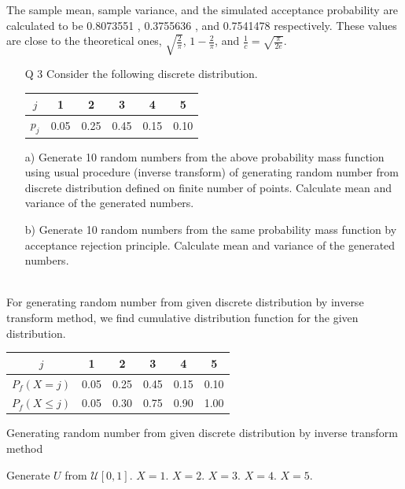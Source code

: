 \documentclass[11pt]{article}
\begin{document}
The sample mean, sample variance, and the simulated acceptance probability are calculated to be 0.8073551 , 0.3755636 , and 0.7541478 respectively.
These values are close to the theoretical ones, $\sqrt{\frac{2}{\pi}}$, $1 - \frac{2}{\pi}$, and $\frac{1}{c} = \sqrt{\frac{\pi}{2e}}$.

\newpage

\begin{enumerate}
\item[Q 3]  Consider the following discrete distribution.
\begin{center}
\begin{tabular}{ cccccc } 
  $j$ & 1 & 2 & 3 & 4 & 5 \\
  \hline
  $p_{j}$ & 0.05 & 0.25 & 0.45 & 0.15 & 0.10 \\
\end{tabular}
\end{center}

a) Generate 10 random numbers from the above probability mass function using usual procedure (inverse transform) of generating random number from discrete distribution defined on finite number of points.
Calculate mean and variance of the generated numbers.

b) Generate 10 random numbers from the same probability mass function by acceptance rejection principle.
Calculate mean and variance of the generated numbers.

\end{enumerate}

\\
 For generating random number from given discrete distribution by inverse transform method, we find cumulative distribution function for the given distribution.\\
\begin{center}
\begin{tabular}{ cccccc } 
  $j$ & 1 & 2 & 3 & 4 & 5 \\
  \hline
  $P_f(X = j)$ & 0.05 & 0.25 & 0.45 & 0.15 & 0.10 \\
  \hline
  $P_f(X \leq j)$ & 0.05 & 0.30 & 0.75 & 0.90 & 1.00 \\
\end{tabular}
\end{center}

\begin{algorithm}[H]
\caption{Generating random number from given discrete distribution by inverse transform method}
\begin{algorithmic}[1]
\STATE Generate $U$ from $\mathcal{U}[0,1]$.
{}
  \STATE  $X = 1$.
  \STATE  $X = 2$.
  \STATE  $X = 3$.
  \STATE  $X = 4$.
\ELSE
  \STATE  $X = 5$.
\ENDIF
\end{algorithmic}
\end{algorithm}
\end{document}
